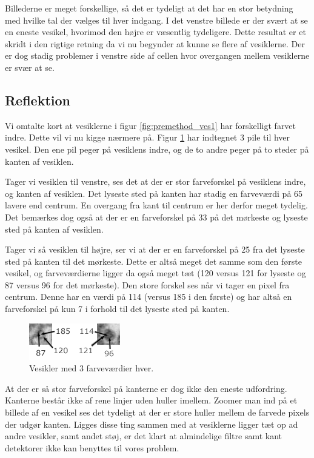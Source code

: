 Billederne er meget forskellige, så det er tydeligt at det har en stor betydning med hvilke tal der vælges til hver indgang. I det venstre billede er der svært at se en eneste vesikel, hvorimod den højre er væsentlig tydeligere. Dette resultat er et skridt i den rigtige retning da vi nu begynder at kunne se flere af vesiklerne. Der er dog stadig problemer i venstre side af cellen hvor overgangen mellem vesiklerne er svær at se.

\subsection{Reflektion}
Vi omtalte kort at vesiklerne i figur \ref{fig:premethod_ves1} har forskelligt farvet indre. Dette vil vi nu kigge nærmere på. Figur \ref{fig:premethod_vescolors} har indtegnet 3 pile til hver vesikel. Den ene pil peger på vesiklens indre, og de to andre peger på to steder på kanten af vesiklen. 

Tager vi vesiklen til venstre, ses det at der er stor farveforskel på vesiklens indre, og kanten af vesiklen. Det lyseste sted på kanten har stadig en farveværdi på 65 lavere end centrum. En overgang fra kant til centrum er her derfor meget tydelig. Det bemærkes dog også at der er en farveforskel på 33 på det mørkeste og lyseste sted på kanten af vesiklen. 

Tager vi så vesiklen til højre, ser vi at der er en farveforskel på 25 fra det lyseste sted på kanten til det mørkeste. Dette er altså meget det samme som den første vesikel, og farveværdierne ligger da også meget tæt (120 versus 121 for lyseste og 87 versus 96 for det mørkeste). Den store forskel ses når vi tager en pixel fra centrum. Denne har en værdi på 114 (versus 185 i den første) og har altså en farveforskel på kun 7 i forhold til det lyseste sted på kanten.

\begin{figure}[H]
	\centering
	\includegraphics[scale=5]{files/premethod/img/ves_colors.png}
	\caption{Vesikler med 3 farveværdier hver.\label{fig:premethod_vescolors}}
\end{figure}

At der er så stor farveforskel på kanterne er dog ikke den eneste udfordring. Kanterne består ikke af rene linjer uden huller imellem. Zoomer man ind på et billede af en vesikel ses det tydeligt at der er store huller mellem de farvede pixels der udgør kanten. Ligges disse ting sammen med at vesiklerne ligger tæt op ad andre vesikler, samt andet støj, er det klart at almindelige filtre samt kant detektorer ikke kan benyttes til vores problem. 

